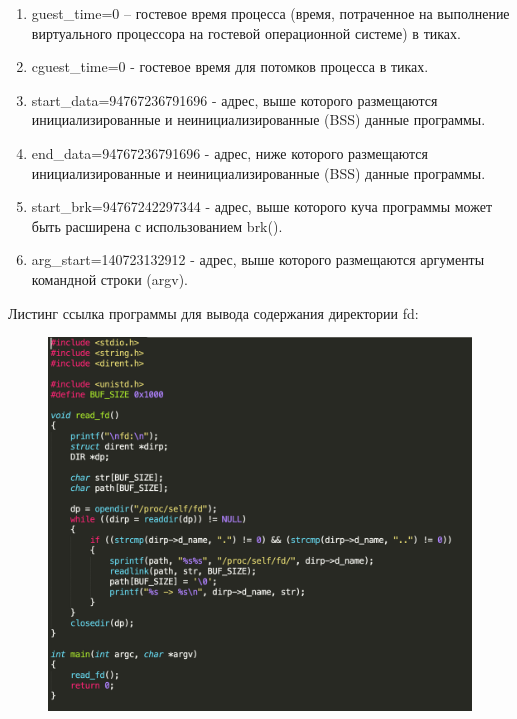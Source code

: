 \documentclass[a4paper,12pt]{article}
\begin{document}
\begin{enumerate}
		\item guest\_time=0 – гостевое время процесса (время, потраченное на выполнение
		виртуального процессора на гостевой операционной системе) в тиках.
		\item cguest\_time=0 - гостевое время для потомков процесса в тиках.
		\item start\_data=94767236791696 - адрес, выше которого размещаются
		инициализированные и неинициализированные (BSS) данные программы.
		\item end\_data=94767236791696 - адрес, ниже которого размещаются
		инициализированные и неинициализированные (BSS) данные программы.
		\item start\_brk=94767242297344 - адрес, выше которого куча программы может быть
		расширена с использованием brk().
		\item arg\_start=140723132912 - адрес, выше которого размещаются аргументы
		командной строки (argv).
	\end{enumerate}
	
	\newpage
	
	Листинг ссылка программы для вывода содержания директории fd:
	
	\begin{figure}[h!]
		\begin{center}
			{\includegraphics[scale = 0.7]{fd1.png}}
			\label{ris:fd1}
		\end{center}
	\end{figure}
	
\end{document}
